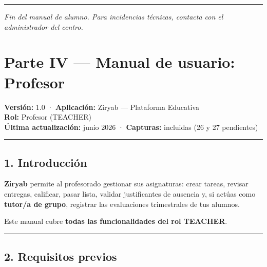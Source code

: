 \documentclass[
  spanish,
  11pt,
]{report}
\begin{document}
\begin{center}\rule{0.5\linewidth}{0.5pt}\end{center}

\emph{Fin del manual de alumno. Para incidencias técnicas, contacta con
el administrador del centro.}

\newpage

\chapter{Parte IV --- Manual de usuario:
Profesor}\label{parte-iv-manual-de-usuario-profesor}

\textbf{Versión:} 1.0 · \textbf{Aplicación:} Ziryab --- Plataforma
Educativa\\
\textbf{Rol:} Profesor (TEACHER)\\
\textbf{Última actualización:} junio 2026 · \textbf{Capturas:} incluidas
(26 y 27 pendientes)

\begin{center}\rule{0.5\linewidth}{0.5pt}\end{center}

\section{1. Introducción}\label{introducciuxf3n-1}

\textbf{Ziryab} permite al profesorado gestionar sus asignaturas: crear
tareas, revisar entregas, calificar, pasar lista, validar justificantes
de ausencia y, si actúas como \textbf{tutor/a de grupo}, registrar las
evaluaciones trimestrales de tus alumnos.

Este manual cubre \textbf{todas las funcionalidades del rol TEACHER}.

\begin{center}\rule{0.5\linewidth}{0.5pt}\end{center}

\section{2. Requisitos previos}\label{requisitos-previos-1}
\end{document}
